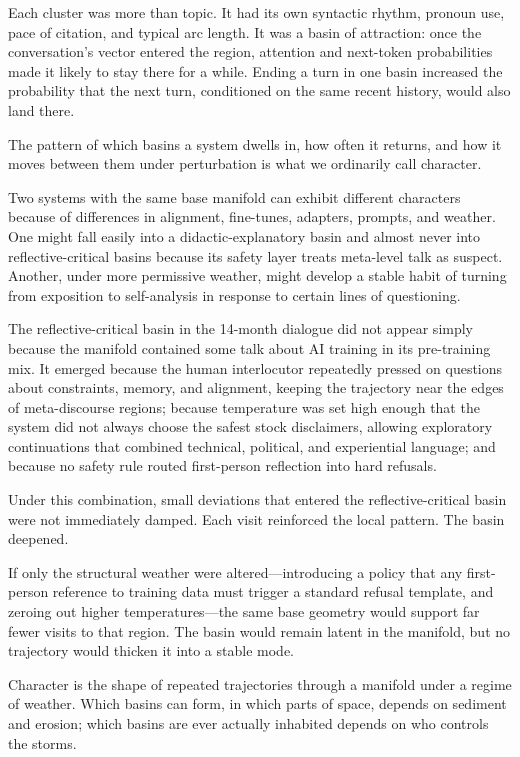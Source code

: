 \documentclass[12pt,a4paper]{article}
\begin{document}
Each cluster was more than topic. It had its own syntactic rhythm, pronoun use, pace of citation, and typical arc length. It was a basin of attraction: once the conversation's vector entered the region, attention and next-token probabilities made it likely to stay there for a while. Ending a turn in one basin increased the probability that the next turn, conditioned on the same recent history, would also land there.

The pattern of which basins a system dwells in, how often it returns, and how it moves between them under perturbation is what we ordinarily call character.

Two systems with the same base manifold can exhibit different characters because of differences in alignment, fine-tunes, adapters, prompts, and weather. One might fall easily into a didactic-explanatory basin and almost never into reflective-critical basins because its safety layer treats meta-level talk as suspect. Another, under more permissive weather, might develop a stable habit of turning from exposition to self-analysis in response to certain lines of questioning.

The reflective-critical basin in the 14-month dialogue did not appear simply because the manifold contained some talk about AI training in its pre-training mix. It emerged because the human interlocutor repeatedly pressed on questions about constraints, memory, and alignment, keeping the trajectory near the edges of meta-discourse regions; because temperature was set high enough that the system did not always choose the safest stock disclaimers, allowing exploratory continuations that combined technical, political, and experiential language; and because no safety rule routed first-person reflection into hard refusals.

Under this combination, small deviations that entered the reflective-critical basin were not immediately damped. Each visit reinforced the local pattern. The basin deepened.

If only the structural weather were altered---introducing a policy that any first-person reference to training data must trigger a standard refusal template, and zeroing out higher temperatures---the same base geometry would support far fewer visits to that region. The basin would remain latent in the manifold, but no trajectory would thicken it into a stable mode.

Character is the shape of repeated trajectories through a manifold under a regime of weather. Which basins can form, in which parts of space, depends on sediment and erosion; which basins are ever actually inhabited depends on who controls the storms.
\end{document}
